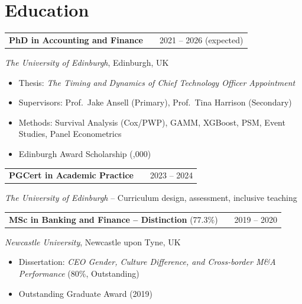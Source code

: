 \section{Education}

\begin{tabularx}{\linewidth}{@{}l X r@{}}
\textbf{PhD in Accounting and Finance} & & 2021 -- 2026 (expected) \\
\end{tabularx}
\textit{The University of Edinburgh}, Edinburgh, UK
\begin{itemize}[nosep, leftmargin=1em, itemsep=2pt, label=--]
    \item Thesis: \textit{The Timing and Dynamics of Chief Technology Officer Appointment}
    \item Supervisors: Prof.\ Jake Ansell (Primary), Prof.\ Tina Harrison (Secondary)
    \item Methods: Survival Analysis (Cox/PWP), GAMM, XGBoost, PSM, Event Studies, Panel Econometrics
    \item Edinburgh Award Scholarship (,000)
\end{itemize}

\vspace{4pt}

\begin{tabularx}{\linewidth}{@{}l X r@{}}
\textbf{PGCert in Academic Practice} & & 2023 -- 2024 \\
\end{tabularx}
\textit{The University of Edinburgh} -- Curriculum design, assessment, inclusive teaching

\vspace{4pt}

\begin{tabularx}{\linewidth}{@{}l X r@{}}
\textbf{MSc in Banking and Finance -- Distinction} (77.3\%) & & 2019 -- 2020 \\
\end{tabularx}
\textit{Newcastle University}, Newcastle upon Tyne, UK
\begin{itemize}[nosep, leftmargin=1em, itemsep=2pt, label=--]
    \item Dissertation: \textit{CEO Gender, Culture Difference, and Cross-border M\&A Performance} (80\%, Outstanding)
    \item Outstanding Graduate Award (2019)
\end{itemize}

\vspace{4pt}

